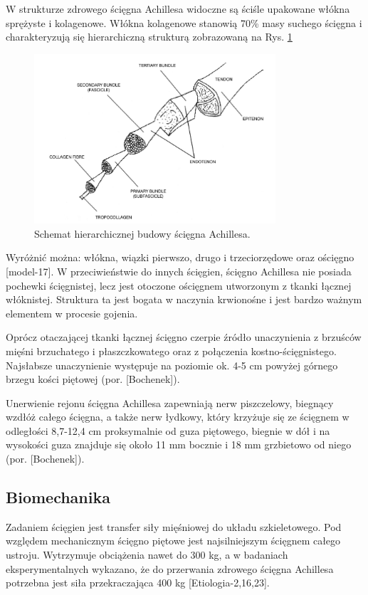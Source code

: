 W strukturze zdrowego ścięgna Achillesa widoczne są ściśle upakowane włókna sprężyste i kolagenowe. Włókna kolagenowe stanowią 70\% masy suchego ścięgna i charakteryzują się hierarchiczną strukturą zobrazowaną na Rys. \ref{Achilles-histology}  
\begin{figure}[h!]
	\centering
	\includegraphics[width=0.8\textwidth]{figures/Achilles_hist.png}
	\caption{Schemat hierarchicznej budowy ścięgna Achillesa.}
	\label{Achilles-histology}
\end{figure}
Wyróżnić można: włókna, wiązki pierwszo, drugo i trzeciorzędowe oraz ościęgno [model-17]. W przeciwieństwie do innych ścięgien, ścięgno Achillesa nie posiada pochewki ścięgnistej, lecz jest otoczone ościęgnem utworzonym z tkanki łącznej włóknistej. Struktura ta jest bogata w naczynia krwionośne i jest bardzo ważnym elementem w procesie gojenia. 

Oprócz otaczającej tkanki łącznej ścięgno czerpie źródło unaczynienia z brzuśców mięśni brzuchatego i płaszczkowatego oraz z połączenia kostno-ścięgnistego. Najsłabsze unaczynienie występuje na poziomie ok. 4-5 cm powyżej górnego brzegu kości piętowej (por. [Bochenek]).

Unerwienie rejonu ścięgna Achillesa zapewniają nerw piszczelowy, biegnący wzdłóż całego ścięgna, a także nerw łydkowy, który krzyżuje się ze ścięgnem w odległości 8,7-12,4 cm proksymalnie od guza piętowego, biegnie w dół i na wysokości guza znajduje się około 11 mm bocznie i 18 mm grzbietowo od niego (por. [Bochenek]). 

\subsection{Biomechanika}
\label{Biomechanika}
Zadaniem ścięgien jest transfer siły mięśniowej do układu szkieletowego. Pod względem mechanicznym ścięgno piętowe jest najsilniejszym ścięgnem całego ustroju. Wytrzymuje obciążenia nawet do 300 kg, a w badaniach eksperymentalnych wykazano, że do przerwania zdrowego ścięgna Achillesa potrzebna jest siła przekraczająca 400 kg [Etiologia-2,16,23]. 

